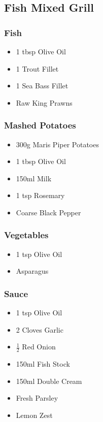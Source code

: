 \documentclass[11pt, english]{article}
\begin{document}
\newpage

	\subsection{Fish Mixed Grill}

		\subsubsection*{Fish}

	\begin{itemize}
        \setlength\itemsep{0cm}
                \item 1 tbsp Olive Oil
		\item 1 Trout Fillet
		\item 1 Sea Bass Fillet
		\item Raw King Prawns
        \end{itemize}

		\subsubsection*{Mashed Potatoes}

	\begin{itemize}
        \setlength\itemsep{0cm}
                \item 300g Maris Piper Potatoes
		\item 1 tbsp Olive Oil
		\item 150ml Milk
		\item 1 tsp Rosemary
		\item Coarse Black Pepper
        \end{itemize}

		\subsubsection*{Vegetables}

	\begin{itemize}
        \setlength\itemsep{0cm}
                \item 1 tsp Olive Oil
		\item Asparagus
        \end{itemize}
	
		\subsubsection*{Sauce}

	\begin{itemize}
        \setlength\itemsep{0cm}
                \item 1 tsp Olive Oil
		\item 2 Cloves Garlic
		\item $\frac{1}{2}$ Red Onion
		\item 150ml Fish Stock
		\item 150ml Double Cream
		\item Fresh Parsley
		\item Lemon Zest
        \end{itemize}
\end{document}
